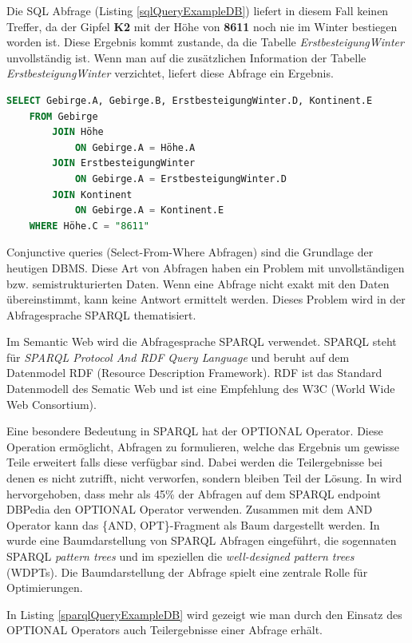 \documentclass[draft,final]{vutinfth} %
\begin{document}
Die SQL Abfrage (Listing \ref{sqlQueryExampleDB}) liefert in diesem Fall keinen Treffer, da der Gipfel \textbf{K2} mit der Höhe von \textbf{8611} noch nie im Winter bestiegen worden ist. Diese Ergebnis kommt zustande, da die Tabelle \textit{ErstbesteigungWinter} unvollständig ist. Wenn man auf die zusätzlichen Information der Tabelle \textit{ErstbesteigungWinter} verzichtet, liefert diese Abfrage ein Ergebnis.

\begin{lstlisting}[language=SQL,caption={SELECT DB Beispiel},frame = single,label={sqlQueryExampleDB}]
SELECT Gebirge.A, Gebirge.B, ErstbesteigungWinter.D, Kontinent.E
	FROM Gebirge 
		JOIN Höhe
			ON Gebirge.A = Höhe.A
		JOIN ErstbesteigungWinter 
			ON Gebirge.A = ErstbesteigungWinter.D
		JOIN Kontinent
			ON Gebirge.A = Kontinent.E
	WHERE Höhe.C = "8611"
\end{lstlisting}

Conjunctive queries (Select-From-Where Abfragen) sind die Grundlage der heutigen DBMS. Diese Art von Abfragen haben ein Problem mit unvollständigen bzw. semistrukturierten Daten. Wenn eine Abfrage nicht exakt mit den Daten übereinstimmt, kann keine Antwort ermittelt werden. Dieses Problem wird in der Abfragesprache SPARQL thematisiert. \cite{DBLP:conf/pods/BarceloPS15}

Im Semantic Web wird die Abfragesprache SPARQL verwendet. SPARQL steht für \textit{SPARQL Protocol And RDF Query Language} und beruht auf dem Datenmodel RDF (Resource Description Framework). RDF ist das Standard Datenmodell des Sematic Web und ist eine Empfehlung des W3C (World Wide Web Consortium). 

Eine besondere Bedeutung in SPARQL hat der OPTIONAL Operator. Diese Operation ermöglicht, Abfragen zu formulieren, welche das Ergebnis um gewisse Teile erweitert falls diese verfügbar sind. Dabei werden die Teilergebnisse bei denen es nicht zutrifft, nicht verworfen, sondern bleiben Teil der Lösung. In \cite{LPPS2013} wird hervorgehoben, dass mehr als 45\% der Abfragen auf dem SPARQL endpoint DBPedia den OPTIONAL Operator verwenden. Zusammen mit dem AND Operator kann das \{AND, OPT\}-Fragment als Baum dargestellt werden. In \cite{LPPS2013} wurde eine Baumdarstellung von SPARQL Abfragen eingeführt, die sogennaten SPARQL \textit{pattern trees} und im speziellen die \textit{well-designed pattern trees} (WDPTs). Die Baumdarstellung der Abfrage spielt eine zentrale Rolle für Optimierungen. 

In Listing \ref{sparqlQueryExampleDB} wird gezeigt wie man durch den Einsatz des OPTIONAL Operators auch Teilergebnisse einer Abfrage erhält.
\end{document}
